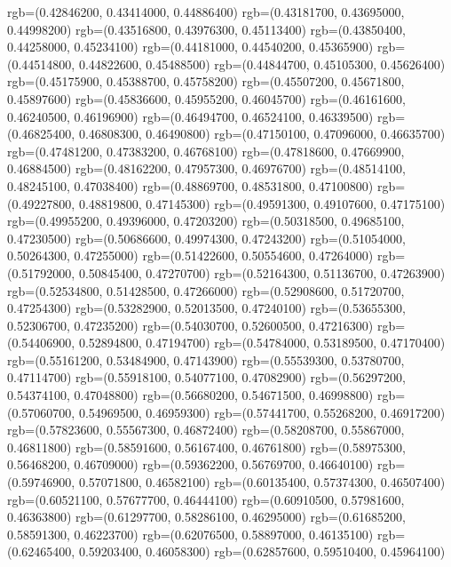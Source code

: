 {{{      rgb=(0.42846200, 0.43414000, 0.44886400)
      rgb=(0.43181700, 0.43695000, 0.44998200)
      rgb=(0.43516800, 0.43976300, 0.45113400)
      rgb=(0.43850400, 0.44258000, 0.45234100)
      rgb=(0.44181000, 0.44540200, 0.45365900)
      rgb=(0.44514800, 0.44822600, 0.45488500)
      rgb=(0.44844700, 0.45105300, 0.45626400)
      rgb=(0.45175900, 0.45388700, 0.45758200)
      rgb=(0.45507200, 0.45671800, 0.45897600)
      rgb=(0.45836600, 0.45955200, 0.46045700)
      rgb=(0.46161600, 0.46240500, 0.46196900)
      rgb=(0.46494700, 0.46524100, 0.46339500)
      rgb=(0.46825400, 0.46808300, 0.46490800)
      rgb=(0.47150100, 0.47096000, 0.46635700)
      rgb=(0.47481200, 0.47383200, 0.46768100)
      rgb=(0.47818600, 0.47669900, 0.46884500)
      rgb=(0.48162200, 0.47957300, 0.46976700)
      rgb=(0.48514100, 0.48245100, 0.47038400)
      rgb=(0.48869700, 0.48531800, 0.47100800)
      rgb=(0.49227800, 0.48819800, 0.47145300)
      rgb=(0.49591300, 0.49107600, 0.47175100)
      rgb=(0.49955200, 0.49396000, 0.47203200)
      rgb=(0.50318500, 0.49685100, 0.47230500)
      rgb=(0.50686600, 0.49974300, 0.47243200)
      rgb=(0.51054000, 0.50264300, 0.47255000)
      rgb=(0.51422600, 0.50554600, 0.47264000)
      rgb=(0.51792000, 0.50845400, 0.47270700)
      rgb=(0.52164300, 0.51136700, 0.47263900)
      rgb=(0.52534800, 0.51428500, 0.47266000)
      rgb=(0.52908600, 0.51720700, 0.47254300)
      rgb=(0.53282900, 0.52013500, 0.47240100)
      rgb=(0.53655300, 0.52306700, 0.47235200)
      rgb=(0.54030700, 0.52600500, 0.47216300)
      rgb=(0.54406900, 0.52894800, 0.47194700)
      rgb=(0.54784000, 0.53189500, 0.47170400)
      rgb=(0.55161200, 0.53484900, 0.47143900)
      rgb=(0.55539300, 0.53780700, 0.47114700)
      rgb=(0.55918100, 0.54077100, 0.47082900)
      rgb=(0.56297200, 0.54374100, 0.47048800)
      rgb=(0.56680200, 0.54671500, 0.46998800)
      rgb=(0.57060700, 0.54969500, 0.46959300)
      rgb=(0.57441700, 0.55268200, 0.46917200)
      rgb=(0.57823600, 0.55567300, 0.46872400)
      rgb=(0.58208700, 0.55867000, 0.46811800)
      rgb=(0.58591600, 0.56167400, 0.46761800)
      rgb=(0.58975300, 0.56468200, 0.46709000)
      rgb=(0.59362200, 0.56769700, 0.46640100)
      rgb=(0.59746900, 0.57071800, 0.46582100)
      rgb=(0.60135400, 0.57374300, 0.46507400)
      rgb=(0.60521100, 0.57677700, 0.46444100)
      rgb=(0.60910500, 0.57981600, 0.46363800)
      rgb=(0.61297700, 0.58286100, 0.46295000)
      rgb=(0.61685200, 0.58591300, 0.46223700)
      rgb=(0.62076500, 0.58897000, 0.46135100)
      rgb=(0.62465400, 0.59203400, 0.46058300)
      rgb=(0.62857600, 0.59510400, 0.45964100)
}}}
